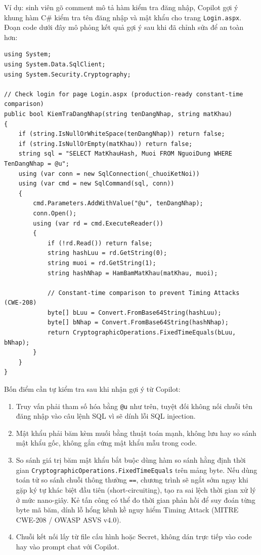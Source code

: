 Ví dụ: sinh viên gõ comment mô tả hàm kiểm tra đăng nhập, Copilot gợi ý khung
hàm C\# kiểm tra tên đăng nhập và mật khẩu cho trang \verb|Login.aspx|.
Đoạn code dưới đây mô phỏng kết quả gợi ý sau khi đã chỉnh sửa để an toàn hơn:

\begin{lstlisting}[language={[Sharp]C}, caption={Ham kiem tra dang nhap an toan voi FixedTimeEquals chong Timing Attack}, label={lst:c43-copilot}]
using System;
using System.Data.SqlClient;
using System.Security.Cryptography;

// Check login for page Login.aspx (production-ready constant-time comparison)
public bool KiemTraDangNhap(string tenDangNhap, string matKhau)
{
    if (string.IsNullOrWhiteSpace(tenDangNhap)) return false;
    if (string.IsNullOrEmpty(matKhau)) return false;
    string sql = "SELECT MatKhauHash, Muoi FROM NguoiDung WHERE TenDangNhap = @u";
    using (var conn = new SqlConnection(_chuoiKetNoi))
    using (var cmd = new SqlCommand(sql, conn))
    {
        cmd.Parameters.AddWithValue("@u", tenDangNhap);
        conn.Open();
        using (var rd = cmd.ExecuteReader())
        {
            if (!rd.Read()) return false;
            string hashLuu = rd.GetString(0);
            string muoi = rd.GetString(1);
            string hashNhap = HamBamMatKhau(matKhau, muoi);

            // Constant-time comparison to prevent Timing Attacks (CWE-208)
            byte[] bLuu = Convert.FromBase64String(hashLuu);
            byte[] bNhap = Convert.FromBase64String(hashNhap);
            return CryptographicOperations.FixedTimeEquals(bLuu, bNhap);
        }
    }
}
\end{lstlisting}

Bốn điểm cần tự kiểm tra sau khi nhận gợi ý từ Copilot:

\begin{enumerate}
\item Truy vấn phải tham số hóa bằng \verb|@u| như trên, tuyệt đối không nối chuỗi
tên đăng nhập vào câu lệnh SQL vì sẽ dính lỗi SQL injection.
\item Mật khẩu phải băm kèm muối bằng thuật toán mạnh, không lưu hay so sánh
mật khẩu gốc, không gắn cứng mật khẩu mẫu trong code.
\item So sánh giá trị băm mật khẩu bắt buộc dùng hàm so sánh hằng định thời gian \verb|CryptographicOperations.FixedTimeEquals| trên mảng byte. Nếu dùng toán tử so sánh chuỗi thông thường \verb|==|, chương trình sẽ ngắt sớm ngay khi gặp ký tự khác biệt đầu tiên (short-circuiting), tạo ra sai lệch thời gian xử lý ở mức nano-giây. Kẻ tấn công có thể đo thời gian phản hồi để suy đoán từng byte mã băm, dính lỗ hổng kênh kề nguy hiểm Timing Attack (MITRE CWE-208 / OWASP ASVS v4.0).
\item Chuỗi kết nối lấy từ file cấu hình hoặc Secret, không dán trực tiếp vào
code hay vào prompt chat với Copilot.
\end{enumerate}

